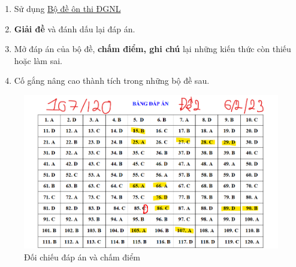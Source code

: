 \begin{enumerate}
    \item Sử dụng \href{https://www.example.com}{Bộ đề ôn thi ĐGNL} \cite{bo_de_thidgnl}
    \item \textbf{Giải đề} và đánh dấu lại đáp án.
    \item Mở đáp án của bộ đề, \textbf{chấm điểm, ghi chú} lại những kiến thức còn thiếu hoặc làm sai. 
    \item Cố gắng nâng cao thành tích trong những bộ đề sau.
\end{enumerate}
\begin{figure}[H]
    \centering
    \includegraphics[width=1\linewidth]{img/Đề 2 -107_120.png}
    \caption{Đối chiếu đáp án và chấm điểm}
    \label{fig:giaidethu}
\end{figure}

